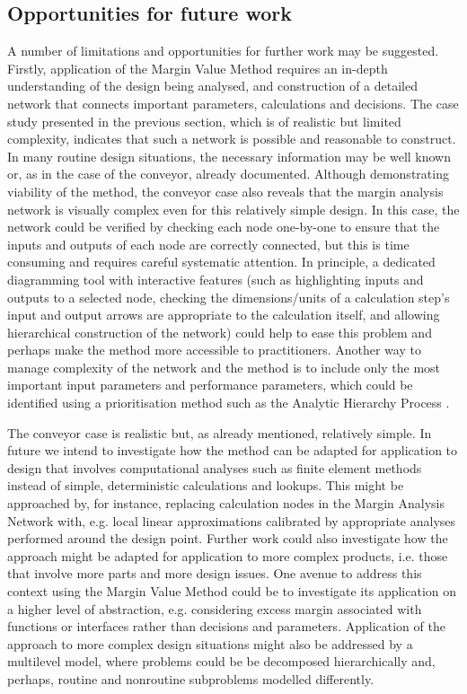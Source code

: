 \subsection{Opportunities for future work}

A number of limitations and opportunities for further work may be suggested. Firstly, application of the Margin Value Method requires an in-depth understanding of the design being analysed, and construction of a detailed network that connects important parameters, calculations and decisions. The case study presented in the previous section, which is of realistic but limited complexity, indicates that such a network is possible and reasonable to construct. In many routine design situations, the necessary information may be well known or, as in the case of the conveyor, already documented. Although demonstrating viability of the method, the conveyor case also reveals that the margin analysis network is visually complex even for this relatively simple design. In this case, the network could be verified by checking each node one-by-one to ensure that the inputs and outputs of each node are correctly connected, but this is time consuming and requires careful systematic attention. In principle, a dedicated diagramming tool with interactive features (such as highlighting inputs and outputs to a selected node, checking the dimensions/units of a calculation step's input and output arrows are appropriate to the calculation itself, and allowing hierarchical construction of the network) could help to ease this problem and perhaps make the method more accessible to practitioners. Another way to manage complexity of the network and the method is to include only the most important input parameters and performance parameters, which could be identified using a prioritisation method such as the Analytic Hierarchy Process \citep{Saaty1988}.

The conveyor case is realistic but, as already mentioned, relatively simple. In future we intend to investigate how the method can be adapted for application to design that involves computational analyses such as finite element methods instead of simple, deterministic calculations and lookups. This might be approached by, for instance, replacing calculation nodes in the Margin Analysis Network with, e.g. local linear approximations calibrated by appropriate analyses performed around the design point. Further work could also investigate how the approach might be adapted for application to more complex products, i.e. those that involve more parts and more design issues. One avenue to address this context using the Margin Value Method could be to investigate its application on a higher level of abstraction, e.g. considering excess margin associated with functions or interfaces rather than decisions and parameters. Application of the approach to more complex design situations might also be addressed by a multilevel model, where problems could be be decomposed hierarchically and, perhaps, routine and nonroutine subproblems modelled differently. 

